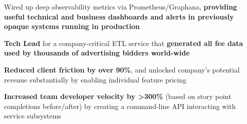 \documentclass[]{two-column-resume}
\begin{document}
\begin{minipage}[t]{0.65\textwidth}
\begin{tightemize}
                            \item Wired up deep observability metrics via Prometheus/Graphana, \textbf{providing useful technical and business dashboards and alerts in previously opaque systems running in production}
                    \end{tightemize}
        \sectionsep
        \vspace{\topsep} %
        \begin{tightemize}
                            \item \textbf{Tech Lead} for a company-critical ETL service that \textbf{generated all fee data used by thousands of advertising bidders world-wide}
                            \item \textbf{Reduced client friction by over 90\%}, and unlocked company's potential revenue substantially by enabling individual feature pricing
                            \item \textbf{Increased team developer velocity by >300\%} (based on story point completions before/after) by creating a command-line API interacting with service subsystems
                    \end{tightemize}
        \sectionsep
    







\end{minipage}
\end{document}
